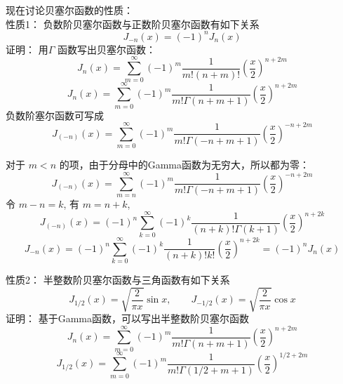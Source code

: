 \begin{frame}
	现在讨论贝塞尔函数的性质：\\
	\alert{性质1：} 负数阶贝塞尔函数与正数阶贝塞尔函数有如下关系
	\begin{equation*}
		J_{-n}(x)=(-1)^n J_n(x)
	\end{equation*}	
	\alert{证明：}  
	用$\Gamma$ 函数写出贝塞尔函数：
	\begin{equation*}
		J_n(x) = \sum\limits_{m=0}^{\infty} (-1)^m  \frac{1}{m! (n+m) ! } (\frac{x}{2})^{n+2m} 
	\end{equation*}	
	\begin{equation*}
		J_n(x) = \sum\limits_{m=0}^{\infty} (-1)^m  \frac{1}{m! \Gamma(n+m+1) } (\frac{x}{2})^{n+2m} 
	\end{equation*}	
	负数阶塞尔函数可写成
	\begin{equation*}
		J_{(-n)}(x) = \sum\limits_{m=0}^{\infty} (-1)^m  \frac{1}{m! \Gamma(-n+m+1) } (\frac{x}{2})^{-n+2m} 
	\end{equation*}	
\end{frame}	

\begin{frame}
	对于 $m<n$ 的项，由于分母中的Gamma函数为无穷大，所以都为零：
	\begin{equation*}
		J_{(-n)}(x) = \sum\limits_{m=n}^{\infty} (-1)^m  \frac{1}{m! \Gamma(-n+m+1) } (\frac{x}{2})^{-n+2m} 
	\end{equation*}	
	令 $m-n=k$, 有 $m=n+k $, 
	\begin{equation*}
		J_{(-n)}(x) = (-1)^n\sum\limits_{k=0}^{\infty} (-1)^k  \frac{1}{(n+k)! \Gamma(k+1) } (\frac{x}{2})^{n+2k} 
	\end{equation*}	
	\begin{equation*}
		J_{-n} (x) = (-1)^n\sum\limits_{k=0}^{\infty} (-1)^k  \frac{1}{(n+k)! k! } (\frac{x}{2})^{n+2k} =(-1)^n J_{n} (x)
	\end{equation*}	
\end{frame}	

\begin{frame}
	\alert{性质2：} 半整数阶贝塞尔函数与三角函数有如下关系
	\begin{equation*}
		J_{1/2} (x) =\sqrt{\frac{2}{\pi x}} \sin x,  \qquad  J_{-1/2} (x) =\sqrt{\frac{2}{\pi x}} \cos x
	\end{equation*}	
	\alert{证明：}  基于Gamma函数，可以写出半整数阶贝塞尔函数
	\begin{equation*}
		J_n(x) = \sum\limits_{m=0}^{\infty} (-1)^m  \frac{1}{m! \Gamma(n+m+1) } (\frac{x}{2})^{n+2m} 
	\end{equation*}	
	\begin{equation*}
		J_{1/2}(x) = \sum\limits_{m=0}^{\infty} (-1)^m  \frac{1}{m! \Gamma(1/2+m+1) } (\frac{x}{2})^{1/2+2m} 
	\end{equation*}	
\end{frame}	

